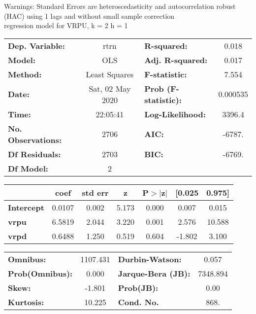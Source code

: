 Warnings: \newline
 [1] Standard Errors are heteroscedasticity and autocorrelation robust (HAC) using 1 lags and without small sample correction\\ 

regression model for VRPU, k = 2 h = 1\begin{center}
\begin{tabular}{lclc}
\toprule
\textbf{Dep. Variable:}    &       rtrn       & \textbf{  R-squared:         } &     0.018   \\
\textbf{Model:}            &       OLS        & \textbf{  Adj. R-squared:    } &     0.017   \\
\textbf{Method:}           &  Least Squares   & \textbf{  F-statistic:       } &     7.554   \\
\textbf{Date:}             & Sat, 02 May 2020 & \textbf{  Prob (F-statistic):} &  0.000535   \\
\textbf{Time:}             &     22:05:41     & \textbf{  Log-Likelihood:    } &    3396.4   \\
\textbf{No. Observations:} &        2706      & \textbf{  AIC:               } &    -6787.   \\
\textbf{Df Residuals:}     &        2703      & \textbf{  BIC:               } &    -6769.   \\
\textbf{Df Model:}         &           2      & \textbf{                     } &             \\
\bottomrule
\end{tabular}
\begin{tabular}{lcccccc}
                   & \textbf{coef} & \textbf{std err} & \textbf{z} & \textbf{P$> |$z$|$} & \textbf{[0.025} & \textbf{0.975]}  \\
\midrule
\textbf{Intercept} &       0.0107  &        0.002     &     5.173  &         0.000        &        0.007    &        0.015     \\
\textbf{vrpu}      &       6.5819  &        2.044     &     3.220  &         0.001        &        2.576    &       10.588     \\
\textbf{vrpd}      &       0.6488  &        1.250     &     0.519  &         0.604        &       -1.802    &        3.100     \\
\bottomrule
\end{tabular}
\begin{tabular}{lclc}
\textbf{Omnibus:}       & 1107.431 & \textbf{  Durbin-Watson:     } &    0.057  \\
\textbf{Prob(Omnibus):} &   0.000  & \textbf{  Jarque-Bera (JB):  } & 7348.894  \\
\textbf{Skew:}          &  -1.801  & \textbf{  Prob(JB):          } &     0.00  \\
\textbf{Kurtosis:}      &  10.225  & \textbf{  Cond. No.          } &     868.  \\
\bottomrule
\end{tabular}
\end{center}

